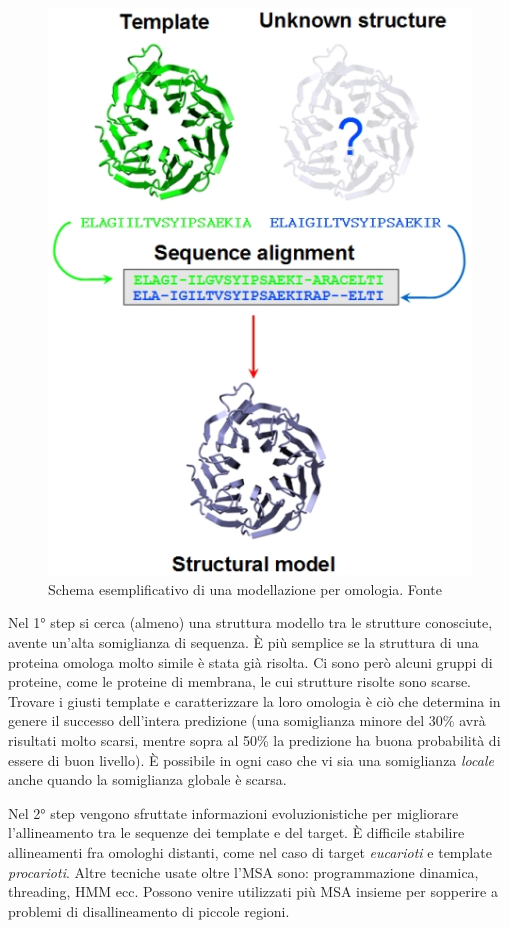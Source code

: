{\begin{figure}[!htb]
		\includegraphics[scale=0.5]{images/homology2.jpg}
		\caption{Schema esemplificativo di una modellazione per omologia. Fonte \cite{UNIL-homology}}
		\label{fig:omologia-esempio}
		\endminipage\hfill
	\end{figure}
	
	Nel 1° step si cerca (almeno) una struttura modello tra le strutture conosciute, avente un'alta somiglianza di sequenza. È più semplice se la struttura di una proteina omologa molto simile è stata già risolta. Ci sono però alcuni gruppi di proteine, come le proteine di membrana, le cui strutture risolte sono scarse. Trovare i giusti template e caratterizzare la loro omologia è ciò che determina in genere il successo dell'intera predizione (una somiglianza minore del 30\% avrà risultati molto scarsi, mentre sopra al 50\% la predizione ha buona probabilità di essere di buon livello). È possibile in ogni caso che vi sia una somiglianza \textit{locale} anche quando la somiglianza globale è scarsa. 
	
	\par Nel 2° step vengono sfruttate informazioni evoluzionistiche per migliorare l'allineamento tra le sequenze dei template e del target. È difficile stabilire allineamenti fra omologhi distanti, come nel caso di target \textit{eucarioti} e template \textit{procarioti}. Altre tecniche usate oltre l'MSA sono: programmazione dinamica, threading, HMM ecc. Possono venire utilizzati più MSA insieme per sopperire a problemi di disallineamento di piccole regioni.
	
}
